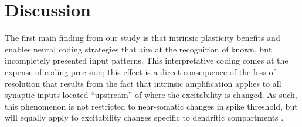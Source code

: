 \section{Discussion}

The first main finding from our study is
        that intrinsic plasticity benefits and enables neural coding strategies
            that aim at the recognition of known, but incompletely presented input patterns.
    This interpretative coding comes at the expense of coding precision;
        this effect is a direct consequence of the loss of resolution
            that results from the fact that intrinsic amplification applies
            to all synaptic inputs located ``upstream'' of where the excitability is changed.
    As such, this phenomenon is not restricted to near-somatic changes in spike threshold,
        but will equally apply to excitability changes specific to dendritic compartments
        \citep{Losonczy2008-pi,Ohtsuki2012-ds}.

